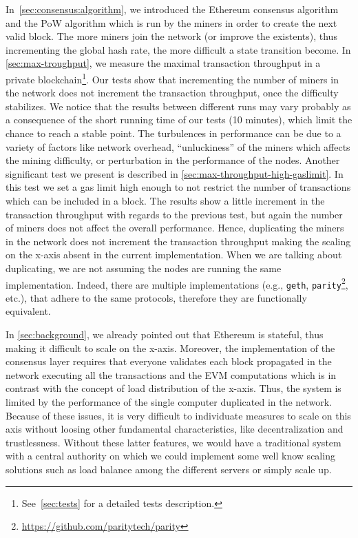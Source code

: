 In~\autoref{sec:consensus:algorithm}, we introduced the Ethereum consensus
algorithm and the PoW algorithm which is run by the miners in order to create
the next valid block. The more miners join the network (or improve the
existents), thus incrementing the global hash rate, the more difficult a state
transition become. In \autoref{sec:max-troughput}, we measure the maximal
transaction throughput in a private blockchain\footnote{See~\autoref{sec:tests}
for a detailed tests description.}. Our tests show that incrementing the number
of miners in the network does not increment the transaction throughput, once the
difficulty stabilizes. We notice that the results between different runs may
vary probably as a consequence of the short running time of our tests (10
minutes), which limit the chance to reach a stable point. The turbulences in
performance can be due to a variety of factors like network overhead,
``unluckiness'' of the miners which affects the mining difficulty, or
perturbation in the performance of the nodes. Another significant test we
present is described in \autoref{sec:max-throughput-high-gaslimit}. In this test
we set a gas limit high enough to not restrict the number of transactions which
can be included in a block. The results show a little increment in the
transaction throughput with regards to the previous test, but again the number
of miners does not affect the overall performance. Hence, duplicating the miners
in the network does not increment the transaction throughput making the scaling
on the x-axis absent in the current implementation. When we are talking about
duplicating, we are not assuming the nodes are running the same implementation.
Indeed, there are multiple implementations (e.g., \texttt{geth},
\texttt{parity}\footnote{\url{https://github.com/paritytech/parity}}, etc.),
that adhere to the same protocols, therefore they are functionally equivalent.

In \autoref{sec:background}, we already pointed out that Ethereum is stateful,
thus making it difficult to scale on the x-axis. Moreover, the implementation of
the consensus layer requires that everyone validates each block propagated in
the network executing all the transactions and the EVM computations which is in
contrast with the concept of load distribution of the x-axis. Thus, the system
is limited by the performance of the single computer duplicated in the network.
Because of these issues, it is very difficult to individuate measures to scale
on this axis without loosing other fundamental characteristics, like
decentralization and trustlessness. Without these latter features, we would have
a traditional system with a central authority on which we could implement some
well know scaling solutions such as load balance among the different servers or
simply scale up.
